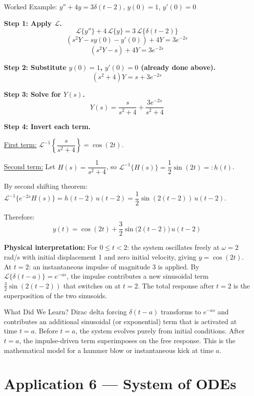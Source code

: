 \documentclass[12pt,a4paper]{article}
\begin{document}
\begin{infobox}{Worked Example: $y'' + 4y = 3\delta(t-2)$, $y(0)=1$, $y'(0)=0$}

\textbf{Step 1: Apply $\mathcal{L}$.}
\[
\mathcal{L}\{y''\} + 4\,\mathcal{L}\{y\} = 3\,\mathcal{L}\{\delta(t-2)\}
\]
\[
(s^2Y - sy(0) - y'(0)) + 4Y = 3e^{-2s}
\]
\[
(s^2Y - s) + 4Y = 3e^{-2s}
\]

\textbf{Step 2: Substitute $y(0)=1$, $y'(0)=0$ (already done above).}
\[
(s^2+4)Y = s + 3e^{-2s}
\]

\textbf{Step 3: Solve for $Y(s)$.}
\[
Y(s) = \frac{s}{s^2+4} + \frac{3e^{-2s}}{s^2+4}
\]

\textbf{Step 4: Invert each term.}

\underline{First term:} $\mathcal{L}^{-1}\!\left\{\dfrac{s}{s^2+4}\right\} = \cos(2t)$.

\underline{Second term:} Let $H(s) = \dfrac{1}{s^2+4}$, so $\mathcal{L}^{-1}\{H(s)\} = \dfrac{1}{2}\sin(2t) =: h(t)$.

By second shifting theorem:
$\mathcal{L}^{-1}\{e^{-2s}H(s)\} = h(t-2)\,u(t-2) = \dfrac{1}{2}\sin(2(t-2))\,u(t-2)$.

Therefore:
\[
\boxed{y(t) = \cos(2t) + \frac{3}{2}\sin\!\bigl(2(t-2)\bigr)\,u(t-2)}
\]

\textbf{Physical interpretation:}
For $0 \leq t < 2$: the system oscillates freely at $\omega = 2$ rad/s with initial
displacement 1 and zero initial velocity, giving $y = \cos(2t)$.
At $t = 2$: an instantaneous impulse of magnitude 3 is applied. By $\mathcal{L}\{\delta(t-a)\} = e^{-as}$,
the impulse contributes a new sinusoidal term $\tfrac{3}{2}\sin(2(t-2))$ that switches on
at $t = 2$. The total response after $t=2$ is the superposition of the two sinusoids.
\end{infobox}

\begin{learnbox}{What Did We Learn?}
Dirac delta forcing $\delta(t-a)$ transforms to $e^{-as}$ and contributes an additional
sinusoidal (or exponential) term that is activated at time $t=a$. Before $t=a$, the
system evolves purely from initial conditions. After $t=a$, the impulse-driven term
superimposes on the free response. This is the mathematical model for a hammer blow or
instantaneous kick at time $a$.
\end{learnbox}

\section{Application 6 --- System of ODEs}
\end{document}
